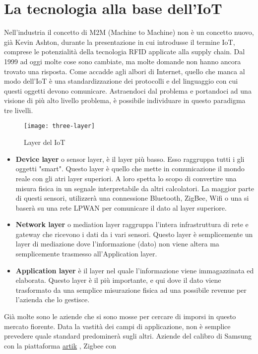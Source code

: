 \section{La tecnologia alla base dell'IoT} 
Nell'industria il concetto di M2M (Machine to Machine) non è un concetto nuovo,
già Kevin Ashton, durante la presentazione in cui introdusse il termine IoT,
comprese le potenzialità della tecnologia RFID applicate alla supply chain. Dal
1999 ad oggi molte cose sono cambiate, ma molte domande non hanno ancora trovato
una risposta. Come accadde agli albori di Internet, quello che manca al modo
dell'IoT è una standardizzazione dei protocolli e del linguaggio con cui questi
oggetti devono comunicare. Astraendoci dal problema e portandoci ad una visione
di più alto livello problema, è possibile individuare in questo paradigma
tre livelli.
\begin{figure}[h]
        \centering 
                \texttt{[image: three-layer]}
        \caption{Layer del IoT}
\end{figure}
\begin{itemize}
\item \textbf{Device layer} o sensor layer, è il layer più basso. Esso raggruppa
tutti i gli oggetti "smart". Questo layer è quello che mette in comunicazione il
mondo reale con gli atri layer superiori. A loro spetta lo scopo di convertire
una misura fisica in un segnale interpretabile da altri calcolatori.
La maggior parte di questi sensori, utilizzerà una connessione Bluetooth,
ZigBee, Wifi o una si baserà su una rete LPWAN per comunicare il dato al layer
superiore.
\item \textbf{Network layer} o mediation layer raggruppa l'intera infrastruttura
di rete e gateway che ricevono i dati da i vari sensori. Questo layer è
semplicemente un layer di mediazione dove l'informazione (dato) non viene altera
ma semplicemente trasmesso all'Application layer.
\item \textbf{Application layer} è il layer nel quale l'informazione viene
immagazzinata ed elaborata. Questo layer è il più importante, e qui dove il dato
viene trasformato da una semplice misurazione fisica ad una possibile revenue
per l'azienda che lo gestisce.%
\end{itemize}
Già molte sono le aziende che si sono mosse per cercare di imporsi in questo
mercato fiorente. Data la vastità dei campi di applicazione, non è semplice
prevedere quale standard predominerà sugli altri.
Aziende del calibro di Samsung con la
piattaforma \href{https://www.artik.io}{artik}  , Zigbee con
